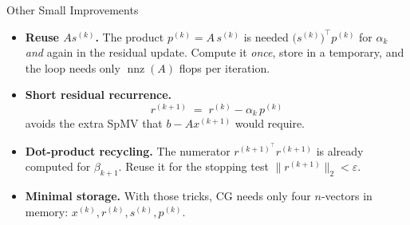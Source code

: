 \documentclass[10pt]{beamer}
\begin{document}

\begin{frame}{Other Small Improvements}

\begin{itemize}
\item \textbf{Reuse \(A s^{(k)}\).}  
      The product \(p^{(k)} = A\,s^{(k)}\) is needed  
      \(
        \bigl(s^{(k)}\bigr)^{\!\top}p^{(k)}
      \)
      for \(\alpha_k\) \emph{and} again in the residual update.  
      Compute it \emph{once}, store in a temporary, and the loop needs only \(\operatorname{nnz}(A)\) flops per iteration.

\item \textbf{Short residual recurrence.}
\[
r^{(k+1)} \;=\; r^{(k)} - \alpha_k\,p^{(k)}
\]
      avoids the extra SpMV that
      \(b - A x^{(k+1)}\) would require.

\item \textbf{Dot-product recycling.}  
      The numerator \(r^{(k+1)^{\!\top}}r^{(k+1)}\) is already computed for \(\beta_{k+1}\).  
      Reuse it for the stopping test \(\|r^{(k+1)}\|_2 < \varepsilon\).

\item \textbf{Minimal storage.}  With those tricks, CG needs only four \(n\)-vectors in memory: \(x^{(k)}, r^{(k)}, s^{(k)}, p^{(k)}\).

\end{itemize}

\end{frame}

\end{document}

